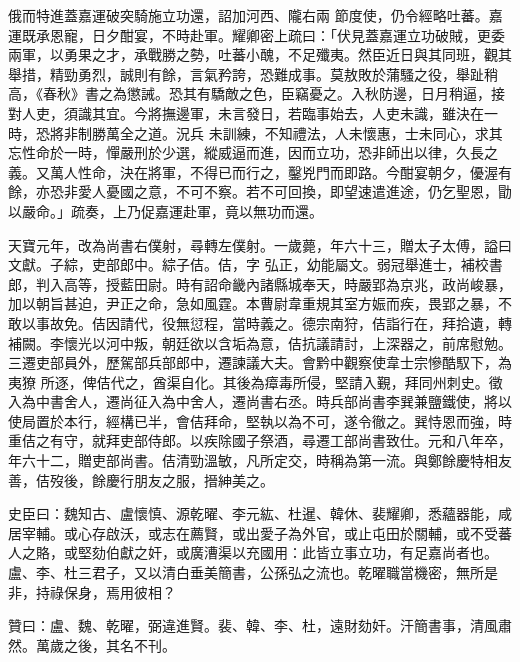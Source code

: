 \begin{pinyinscope}
 俄而特進蓋嘉運破突騎施立功還，詔加河西、隴右兩
 節度使，仍令經略吐蕃。嘉運既承恩寵，日夕酣宴，不時赴軍。耀卿密上疏曰：「伏見蓋嘉運立功破賊，更委兩軍，以勇果之才，承戰勝之勢，吐蕃小醜，不足殲夷。然臣近日與其同班，觀其舉措，精勁勇烈，誠則有餘，言氣矜誇，恐難成事。莫敖敗於蒲騷之役，舉趾稍高，《春秋》書之為懲誡。恐其有驕敵之色，臣竊憂之。入秋防邊，日月稍逼，接對人吏，須識其宜。今將撫邊軍，未言發日，若臨事始去，人吏未識，雖決在一時，恐將非制勝萬全之道。況兵
 未訓練，不知禮法，人未懷惠，士未同心，求其忘性命於一時，憚嚴刑於少選，縱威逼而進，因而立功，恐非師出以律，久長之義。又萬人性命，決在將軍，不得已而行之，鑿兇門而即路。今酣宴朝夕，優渥有餘，亦恐非愛人憂國之意，不可不察。若不可回換，即望速遣進途，仍乞聖恩，勖以嚴命。」疏奏，上乃促嘉運赴軍，竟以無功而還。



 天寶元年，改為尚書右僕射，尋轉左僕射。一歲薨，年六十三，贈太子太傅，謚曰文獻。子綜，吏部郎中。綜子佶。佶，字
 弘正，幼能屬文。弱冠舉進士，補校書郎，判入高等，授藍田尉。時有詔命畿內諸縣城奉天，時嚴郢為京兆，政尚峻暴，加以朝旨甚迫，尹正之命，急如風霆。本曹尉韋重規其室方娠而疾，畏郢之暴，不敢以事故免。佶因請代，役無愆程，當時義之。德宗南狩，佶詣行在，拜拾遺，轉補闕。李懷光以河中叛，朝廷欲以含垢為意，佶抗議請討，上深器之，前席慰勉。三遷吏部員外，歷駕部兵部郎中，遷諫議大夫。會黔中觀察使韋士宗慘酷馭下，為夷獠
 所逐，俾佶代之，酋渠自化。其後為瘴毒所侵，堅請入覲，拜同州刺史。徵入為中書舍人，遷尚征入為中舍人，遷尚書右丞。時兵部尚書李巽兼鹽鐵使，將以使局置於本行，經構已半，會佶拜命，堅執以為不可，遂令徹之。巽恃恩而強，時重佶之有守，就拜吏部侍郎。以疾除國子祭酒，尋遷工部尚書致仕。元和八年卒，年六十二，贈吏部尚書。佶清勁溫敏，凡所定交，時稱為第一流。與鄭餘慶特相友善，佶歿後，餘慶行朋友之服，搢紳美之。



 史臣曰：魏知古、盧懷慎、源乾曜、李元紘、杜暹、韓休、裴耀卿，悉蘊器能，咸居宰輔。或心存啟沃，或志在薦賢，或出愛子為外官，或止屯田於關輔，或不受蕃人之賂，或堅劾伯獻之奸，或廣漕渠以充國用：此皆立事立功，有足嘉尚者也。盧、李、杜三君子，又以清白垂美簡書，公孫弘之流也。乾曜職當機密，無所是非，持祿保身，焉用彼相？



 贊曰：盧、魏、乾曜，弼違進賢。裴、韓、李、杜，遠財劾奸。汗簡書事，清風肅然。萬歲之後，其名不刊。



\end{pinyinscope}